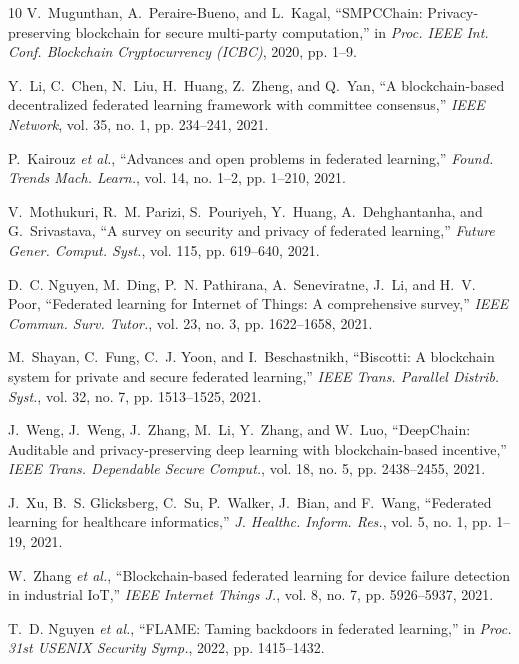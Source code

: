 \documentclass{ieeeaccess}
\begin{document}
\begin{thebibliography}{10}
V.~Mugunthan, A.~Peraire-Bueno, and L.~Kagal,
``SMPCChain: Privacy-preserving blockchain for secure multi-party computation,''
in \emph{Proc. IEEE Int. Conf. Blockchain Cryptocurrency (ICBC)}, 2020, pp. 1--9.

Y.~Li, C.~Chen, N.~Liu, H.~Huang, Z.~Zheng, and Q.~Yan,
``A blockchain-based decentralized federated learning framework with committee consensus,''
\emph{IEEE Network}, vol. 35, no. 1, pp. 234--241, 2021.

P.~Kairouz \emph{et al.},
``Advances and open problems in federated learning,''
\emph{Found. Trends Mach. Learn.}, vol. 14, no. 1--2, pp. 1--210, 2021.

V.~Mothukuri, R.~M. Parizi, S.~Pouriyeh, Y.~Huang, A.~Dehghantanha, and G.~Srivastava,
``A survey on security and privacy of federated learning,''
\emph{Future Gener. Comput. Syst.}, vol. 115, pp. 619--640, 2021.

D.~C. Nguyen, M.~Ding, P.~N. Pathirana, A.~Seneviratne, J.~Li, and H.~V. Poor,
``Federated learning for Internet of Things: A comprehensive survey,''
\emph{IEEE Commun. Surv. Tutor.}, vol. 23, no. 3, pp. 1622--1658, 2021.

M.~Shayan, C.~Fung, C.~J. Yoon, and I.~Beschastnikh,
``Biscotti: A blockchain system for private and secure federated learning,''
\emph{IEEE Trans. Parallel Distrib. Syst.}, vol. 32, no. 7, pp. 1513--1525, 2021.

J.~Weng, J.~Weng, J.~Zhang, M.~Li, Y.~Zhang, and W.~Luo,
``DeepChain: Auditable and privacy-preserving deep learning with blockchain-based incentive,''
\emph{IEEE Trans. Dependable Secure Comput.}, vol. 18, no. 5, pp. 2438--2455, 2021.

J.~Xu, B.~S. Glicksberg, C.~Su, P.~Walker, J.~Bian, and F.~Wang,
``Federated learning for healthcare informatics,''
\emph{J. Healthc. Inform. Res.}, vol. 5, no. 1, pp. 1--19, 2021.

W.~Zhang \emph{et al.},
``Blockchain-based federated learning for device failure detection in industrial IoT,''
\emph{IEEE Internet Things J.}, vol. 8, no. 7, pp. 5926--5937, 2021.

T.~D. Nguyen \emph{et al.},
``FLAME: Taming backdoors in federated learning,''
in \emph{Proc. 31st USENIX Security Symp.}, 2022, pp. 1415--1432.


\end{thebibliography}
\end{document}
